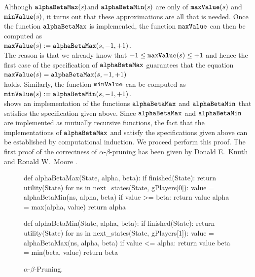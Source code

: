 Although $\texttt{alphaBetaMax}(s)$and $\texttt{alphaBetaMin}(s)$  are only  of
$\texttt{maxValue}(s)$ and $\texttt{minValue}(s)$, it turns out that these approximations are all that
is needed.  Once the function $\texttt{alphaBetaMax}$ is implemented, the function
$\texttt{maxValue}$ can then be computed as 
\\[0.2cm]
\hspace*{1.3cm}
$\texttt{maxValue}(s) := \texttt{alphaBetaMax}(s, -1, +1)$.
\\[0.2cm]
The reason is that we already know that $-1 \leq \texttt{maxValue}(s) \leq +1$ and hence the first case of the
specification of $\texttt{alphaBetaMax}$ guarantees that the equation
\\[0.2cm]
\hspace*{1.3cm}
$\texttt{maxValue}(s) = \texttt{alphaBetaMax}(s,-1,+1)$
\\[0.2cm]
holds.  Similarly, the function $\texttt{minValue}$ can be computed as 
\\[0.2cm]
\hspace*{1.3cm}
$\texttt{minValue}(s) := \texttt{alphaBetaMin}(s, -1, +1)$.
\\[0.2cm]
 shows an implementation of the functions $\texttt{alphaBetaMax}$ and
$\texttt{alphaBetaMin}$ that satisfies the specification given above.
Since $\texttt{alphaBetaMax}$ and $\texttt{alphaBetaMin}$ are implemented as mutually recursive functions, 
the fact that the implementations of $\texttt{alphaBetaMax}$ and 
satisfy the specifications given above can be established by computational induction.
We proceed perform this proof.  The first proof of the correctness of $\alpha$-$\beta$-pruning has been given
by Donald E.~Knuth and Ronald W.~Moore \cite{knuth:1975}.


\begin{figure}[!ht]
\centering
\begin{python3code}
def alphaBetaMax(State, alpha, beta):
    if finished(State):
        return utility(State)
    for ns in next_states(State, gPlayers[0]):
        value = alphaBetaMin(ns, alpha, beta)
        if value >= beta:
            return value
        alpha = max(alpha, value)
    return alpha

def alphaBetaMin(State, alpha, beta):
    if finished(State):
        return utility(State)
    for ns in next_states(State, gPlayers[1]):
        value = alphaBetaMax(ns, alpha, beta)
        if value <= alpha:
            return value
        beta = min(beta, value)
    return beta
\end{python3code}
\caption{$\alpha$-$\beta$-Pruning.}
\label{fig:Alpha-Beta-Pruning.ipynb:alphaBeta}
\end{figure}

